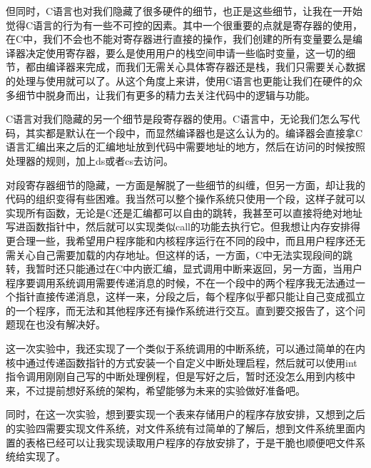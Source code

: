 \documentclass[forprint]{WHUBachelor}
\begin{document}
但同时，C语言也对我们隐藏了很多硬件的细节，也正是这些细节，让我在一开始觉得C语言的行为有一些不可控的因素。其中一个很重要的点就是寄存器的使用，在C中，我们不会也不能对寄存器进行直接的操作，我们创建的所有变量要么是编译器决定使用寄存器，要么是使用用户的栈空间申请一些临时变量，这一切的细节，都由编译器来完成，而我们无需关心具体寄存器还是栈，我们只需要关心数据的处理与使用就可以了。从这个角度上来讲，使用C语言也更能让我们在硬件的众多细节中脱身而出，让我们有更多的精力去关注代码中的逻辑与功能。

C语言对我们隐藏的另一个细节是段寄存器的使用。C语言中，无论我们怎么写代码，其实都是默认在一个段中，而显然编译器也是这么认为的。编译器会直接拿C语言汇编出来之后的汇编地址放到代码中需要地址的地方，然后在访问的时候按照处理器的规则，加上ds或者cs去访问。

对段寄存器细节的隐藏，一方面是解脱了一些细节的纠缠，但另一方面，却让我的代码的组织变得有些困难。我当然可以整个操作系统只使用一个段，这样子就可以实现所有函数，无论是C还是汇编都可以自由的跳转，我甚至可以直接将绝对地址写进函数指针中，然后就可以实现类似call的功能去执行它。但我想让内存安排得更合理一些，我希望用户程序能和内核程序运行在不同的段中，而且用户程序还无需关心自己需要加载的内存地址。但这样的话，一方面，C中无法实现段间的跳转，我暂时还只能通过在C中内嵌汇编，显式调用中断来返回，另一方面，当用户程序要调用系统调用需要传递消息的时候，不在一个段中的两个程序我无法通过一个指针直接传递消息，这样一来，分段之后，每个程序似乎都只能让自己变成孤立的一个程序，而无法和其他程序还有操作系统进行交互。直到要交报告了，这个问题现在也没有解决好。

这一次实验中，我还实现了一个类似于系统调用的中断系统，可以通过简单的在内核中通过传递函数指针的方式安装一个自定义中断处理启程，然后就可以使用int指令调用刚刚自己写的中断处理例程，但是写好之后，暂时还没怎么用到内核中来，不过提前想好系统的架构，希望能够为未来的实验做好准备吧。

同时，在这一次实验，想到要实现一个表来存储用户的程序存放安排，又想到之后的实验四需要实现文件系统，对文件系统有过简单的了解后，想到文件系统里面内置的表格已经可以让我实现读取用户程序的存放安排了，于是干脆也顺便吧文件系统给实现了。







% 
\end{document}
